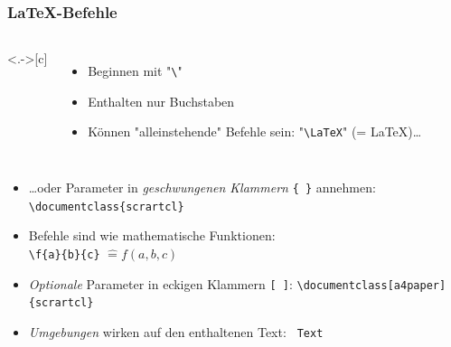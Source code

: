 \begin{frame}[<+->][fragile]
	\frametitle{\LaTeX-Befehle}

	\begin{columns}<.->[c]
		\begin{itemize}
			\item Beginnen mit "\lstinline!\!"
			\item Enthalten nur Buchstaben
			\item Können "alleinstehende" Befehle sein: "\lstinline!\LaTeX!" (= \LaTeX)\dots
		\end{itemize}

	\end{columns}
	
	\lstset{frame=none, numbers=none, xleftmargin=0cm}
	\begin{itemize}
		\item \dots oder Parameter in \emph{geschwungenen Klammern} \lstinline!{ }! annehmen:
		\lstinline!\documentclass{scrartcl}!
		\item Befehle sind wie mathematische Funktionen:\\
		\lstinline!\f{a}{b}{c}! $\mathrel{\widehat{=}} f(a, b, c)$
		\item \emph{Optionale} Parameter in eckigen Klammern \verb|[ ]|:
		\lstinline!\documentclass[a4paper]{scrartcl}!
		\item \emph{Umgebungen} wirken auf den enthaltenen Text:
		\lstinline! Text !
	\end{itemize}
\end{frame}

